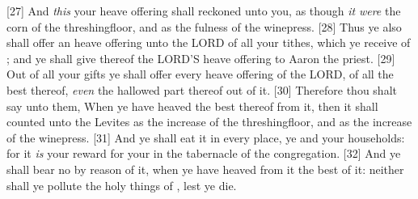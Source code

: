 [27] \textcolor[cmyk]{0.99998,1,0,0}{And \emph{this} your heave offering shall  reckoned unto you, as though \emph{it} \emph{were} the corn of the threshingfloor, and as the fulness of the winepress.}
[28] \textcolor[cmyk]{0.99998,1,0,0}{Thus ye also shall offer an heave offering unto the LORD of all your tithes, which ye receive of ; and ye shall give thereof the LORD'S heave offering to Aaron the priest.}
[29] \textcolor[cmyk]{0.99998,1,0,0}{Out of all your gifts ye shall offer every heave offering of the LORD, of all the best thereof, \emph{even} the hallowed part thereof out of it.}
[30] \textcolor[cmyk]{0.99998,1,0,0}{Therefore thou shalt say unto them, When ye have heaved the best thereof from it, then it shall  counted unto the Levites as the increase of the threshingfloor, and as the increase of the winepress.}
[31] \textcolor[cmyk]{0.99998,1,0,0}{And ye shall eat it in every place, ye and your households: for it \emph{is} your reward for your  in the tabernacle of the congregation.}
[32] \textcolor[cmyk]{0.99998,1,0,0}{And ye shall bear no  by reason of it, when ye have heaved from it the best of it: neither shall ye pollute the holy things of , lest ye die.}